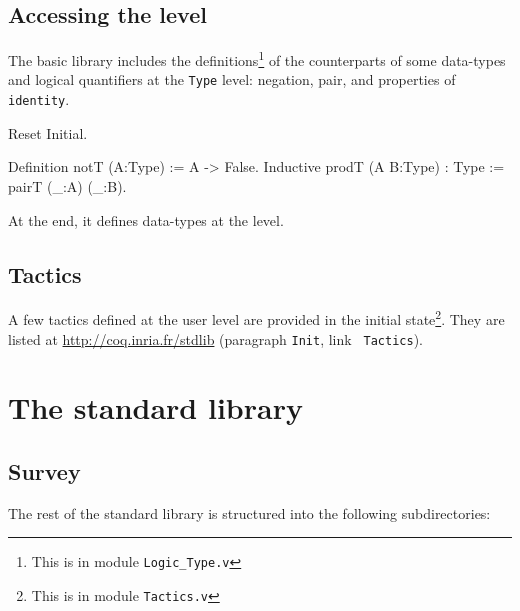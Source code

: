 \subsection{Accessing the {\Type} level}

The basic library includes the definitions\footnote{This is in module
{\tt Logic\_Type.v}} of the counterparts of some data-types and logical
quantifiers at the \verb:Type: level: negation, pair, and properties
of {\tt identity}.

\begin{coq_eval}
Reset Initial.
\end{coq_eval}
\begin{coq_example*}
Definition notT (A:Type) := A -> False.
Inductive prodT (A B:Type) : Type := pairT (_:A) (_:B).
\end{coq_example*}

At the end, it defines data-types at the {\Type} level.

\subsection{Tactics}

A few tactics defined at the user level are provided in the initial
state\footnote{This is in module {\tt Tactics.v}}. They are listed at
\url{http://coq.inria.fr/stdlib} (paragraph {\tt Init}, link {\tt
  Tactics}).

\section{The standard library}

\subsection{Survey}

The rest of the standard library is structured into the following 
subdirectories:

